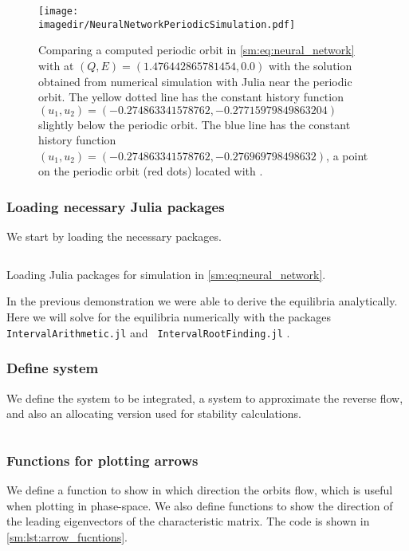 \begin{figure}[ht]
    \centering
    \texttt{[image: \\imagedir/NeuralNetworkPeriodicSimulation.pdf]}
    \caption{Comparing a computed periodic orbit in \cref{sm:eq:neural_network}
        with \DDEBIFTOOL at $(Q,E)=(1.476442865781454, 0.0)$ with the solution
        obtained from numerical simulation with Julia near the periodic orbit.
        The yellow dotted line has the constant history function $(u_1,u_2) =
        (-0.274863341578762, -0.27715979849863204)$ slightly below the periodic
        orbit.  The blue line has the constant history function $(u_1,u_2) =
        (-0.274863341578762, -0.276969798498632)$, a point on the periodic
        orbit (red dots) located with \DDEBIFTOOL.
    }
    \label{sm:fig:NeuralNetworkPeriodicSimulation}
\end{figure}

\subsubsection{Loading necessary Julia packages}
We start by loading the necessary packages.

%
\begin{listing}[!ht]
\inputminted[firstline=1, lastline=6]{julia}{\pathToJuliaFiles/neural_network_model_simulation_article.jl}
\caption{Loading Julia packages for simulation in \cref{sm:eq:neural_network}.}
\label{sm:lst:neuralNetworkLoadingPacakges}
\end{listing}

In the previous demonstration we were able to derive the equilibria
analytically.  Here we will solve for the equilibria numerically with the
packages {\tt IntervalArithmetic.jl} \cite{IntervalArithmetic} and  {\tt
IntervalRootFinding.jl} \cite{IntervalRootFinding}.

\subsubsection{Define system}
We define the system to be integrated, a system to approximate the reverse
flow, and also an allocating version used for stability calculations.
\inputminted[firstline=8, lastline=27]{julia}{\pathToJuliaFiles/neural_network_model_simulation_article.jl}

\subsubsection{Functions for plotting arrows}
We define a function to show in which direction the orbits flow, which is
useful when plotting in phase-space. We also define functions to show the
direction of the leading eigenvectors of the characteristic matrix.
The code is shown in \cref{sm:lst:arrow_fucntions}.

